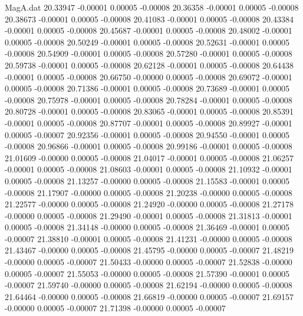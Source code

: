 \begin{filecontents}{MagA.dat}
  20.33947   -0.00001    0.00005   -0.00008
  20.36358   -0.00001    0.00005   -0.00008
  20.38673   -0.00001    0.00005   -0.00008
  20.41083   -0.00001    0.00005   -0.00008
  20.43384   -0.00001    0.00005   -0.00008
  20.45687   -0.00001    0.00005   -0.00008
  20.48002   -0.00001    0.00005   -0.00008
  20.50249   -0.00001    0.00005   -0.00008
  20.52631   -0.00001    0.00005   -0.00008
  20.54909   -0.00001    0.00005   -0.00008
  20.57280   -0.00001    0.00005   -0.00008
  20.59738   -0.00001    0.00005   -0.00008
  20.62128   -0.00001    0.00005   -0.00008
  20.64438   -0.00001    0.00005   -0.00008
  20.66750   -0.00000    0.00005   -0.00008
  20.69072   -0.00001    0.00005   -0.00008
  20.71386   -0.00001    0.00005   -0.00008
  20.73689   -0.00001    0.00005   -0.00008
  20.75978   -0.00001    0.00005   -0.00008
  20.78284   -0.00001    0.00005   -0.00008
  20.80728   -0.00001    0.00005   -0.00008
  20.83065   -0.00001    0.00005   -0.00008
  20.85391   -0.00001    0.00005   -0.00008
  20.87707   -0.00001    0.00005   -0.00008
  20.89927   -0.00001    0.00005   -0.00007
  20.92356   -0.00001    0.00005   -0.00008
  20.94550   -0.00001    0.00005   -0.00008
  20.96866   -0.00001    0.00005   -0.00008
  20.99186   -0.00001    0.00005   -0.00008
  21.01609   -0.00000    0.00005   -0.00008
  21.04017   -0.00001    0.00005   -0.00008
  21.06257   -0.00001    0.00005   -0.00008
  21.08603   -0.00001    0.00005   -0.00008
  21.10932   -0.00001    0.00005   -0.00008
  21.13257   -0.00000    0.00005   -0.00008
  21.15583   -0.00001    0.00005   -0.00008
  21.17907   -0.00000    0.00005   -0.00008
  21.20238   -0.00000    0.00005   -0.00008
  21.22577   -0.00000    0.00005   -0.00008
  21.24920   -0.00000    0.00005   -0.00008
  21.27178   -0.00000    0.00005   -0.00008
  21.29490   -0.00001    0.00005   -0.00008
  21.31813   -0.00001    0.00005   -0.00008
  21.34148   -0.00000    0.00005   -0.00008
  21.36469   -0.00001    0.00005   -0.00007
  21.38810   -0.00001    0.00005   -0.00008
  21.41231   -0.00000    0.00005   -0.00008
  21.43467   -0.00000    0.00005   -0.00008
  21.45795   -0.00000    0.00005   -0.00007
  21.48219   -0.00000    0.00005   -0.00007
  21.50433   -0.00000    0.00005   -0.00007
  21.52838   -0.00000    0.00005   -0.00007
  21.55053   -0.00000    0.00005   -0.00008
  21.57390   -0.00001    0.00005   -0.00007
  21.59740   -0.00000    0.00005   -0.00008
  21.62194   -0.00000    0.00005   -0.00008
  21.64464   -0.00000    0.00005   -0.00008
  21.66819   -0.00000    0.00005   -0.00007
  21.69157   -0.00000    0.00005   -0.00007
  21.71398   -0.00000    0.00005   -0.00007

\end{filecontents}
